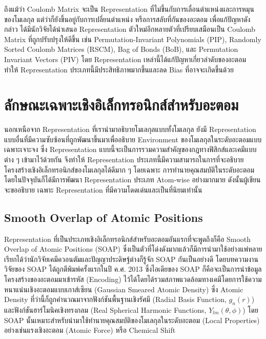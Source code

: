 ถึงแม้ว่า Coulomb Matrix จะเป็น Representation ที่ไม่ขึ้นกับการเลื่อนตำแหน่งและการหมุนของโมเลกุล แต่ว่าก็ยังขึ้นอยู่กับการเปลี่ยนตำแหน่ง%
หรือการสลับที่กันของอะตอม เพื่อแก้ปัญหาดังกล่าว ได้มีนักวิจัยได้นำเสนอ Representation ตัวใหม่อีกหลายตัวที่เปรียบเสมือนเป็น Coulomb Matrix 
ที่ถูกปรับปรุงให้ดีขึ้น เช่น Permutation-Invariant Polynomials (PIP)\cite{braams2009}, Randomly Sorted Coulomb Matrices 
(RSCM)\cite{hansen2013}, Bag of Bonds (BoB)\cite{hansen2013}, และ Permutation Invariant Vectors (PIV)\cite{gallet2013} 
โดย Representation เหล่านี้ได้แก้ปัญหาเกี่ยวลำดับของอะตอม ทำให้ Representation ประเภทนี้มีประสิทธิภาพมากขึ้นและลด Bias ที่อาจจะเกิดขึ้นด้วย

\section{ลักษณะเฉพาะเชิงอิเล็กทรอนิกส์สำหรับอะตอม}

นอกเหนือจาก Representation ที่เรานำมาอธิบายโมเลกุลแบบทั้งโมเลกุล ยังมี Representation แบบอื่นที่มีความซับซ้อนที่ถูกพัฒนาขึ้นมาเพื่ออธิบาย
Environment ของโมเลกุลในระดับอะตอมแบบเฉพาะเจาะจง ซึ่ง Representation แบบนี้จะเป็นการรวมความสำคัญของกฎทางฟิสิกส์และเคมีแบบต่าง ๆ 
เข้ามาไว้ด้วยกัน จึงทำให้ Representation ประเภทนี้มีความสามารถในการที่จะอธิบายโครงสร้างเชิงอิเล็กทรอนิกส์ของโมเลกุลได้ดีมาก ๆ โดยเฉพาะ%
การทำนายคุณสมบัติในระดับอะตอม โดยในปัจจุบันก็ได้มีการพัฒนา Representation ประเภท Atom-wise อย่างมากมาย ดังนั้นผู้เขียนจะขออธิบาย%
เฉพาะ Representation ที่มีความโดดเด่นและเป็นที่นิยมเท่านั้น

\subsection{Smooth Overlap of Atomic Positions}

Representation ที่เป็นประเภทเชิงอิเล็กทรอนิกส์สำหรับอะตอมอันแรกที่จะพูดถึงก็คือ Smooth Overlap of Atomic Positions (SOAP) 
ซึ่งเป็นตัวที่โด่งดังมากแล้วก็มีการนำมาใช้อย่างแพ่หลาย เรียกได้ว่านักวิจัยเคมีควอนตัมและปัญญาประดิษฐ์ต่างก็รู้จัก SOAP กันเป็นอย่างดี
โดยบทความงานวิจัยของ SOAP ได้ถูกตีพิมพ์ครั้งแรกในปี ค.ศ. 2013 ซึ่งไอเดียของ SOAP ก็คือจะเป็นการนำข้อมูลโครงสร้างของอะตอมมาเข้ารหัส 
(Encoding) ไว้ได้โดยได้รวมสภาพแวดล้อมทางเคมีโดยการใช้ความหนาแน่นเชิงอะตอมแบบเกาส์เซียน (Gaussian Smeared Atomic Density) 
ซึ่ง Atomic Density ที่ว่านี้ก็ถูกคำนวณมาจากฟังก์ชันพื้นฐานเชิงรัศมี (Radial Basis Function, $g_{n}(r)$) และฟังก์ชันฮาร์โมนิคเชิงทรงกลม 
(Real Spherical Harmonic Functions, $Y_{lm}(\theta, \phi)$)\cite{bartok2013,de2016}
โดย SOAP นั้นเหมาะสำหรับนำมาใช้ทำนายคุณสมบัติของโมเลกุลในระดับอะตอม (Local Properties) อย่างเช่นแรงเชิงอะตอม (Atomic Force) 
หรือ Chemical Shift

